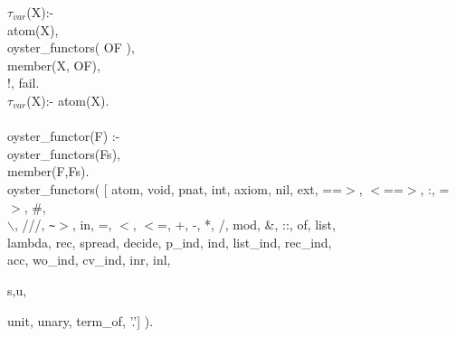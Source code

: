 \documentclass[11pt]{report}
\newcommand{\inv}[1]{\index{#1}}
\begin{document}
 \inv{$\tau_{var}$}
\begin{sf}\begin{tabbing}
$\tau_{var}$(X):-\\[-0.15ex]
\hspace{2em}atom(X),\\[-0.15ex]
\hspace{2em}oyster\_\hspace{0.1em}functors( OF ),\\[-0.15ex]
\hspace{2em}member(X, OF),\\[-0.15ex]
\hspace{2em}!, fail.\\[-0.15ex]
$\tau_{var}$(X):- atom(X).\\[-0.7ex]
\\[-0.15ex]
oyster\_\hspace{0.1em}functor(F) :-\\[-0.15ex]
\hspace{2em}oyster\_\hspace{0.1em}functors(Fs),\\[-0.15ex]
\hspace{2em}member(F,Fs).\\[-0.15ex]
oyster\_\hspace{0.1em}functors( [ atom, void, pnat, int, axiom, nil, ext, ==$>$, $<$==$>$, :, =$>$, \#, \\[-0.15ex]
\hspace{6em}$\backslash$, ///, {\verb`~`}$>$, in, =, $<$, $<$=, +, -, *, /, mod, \&, ::, of, list,\\[-0.15ex]
\hspace{6em}lambda, rec, spread, decide, p\_\hspace{0.1em}ind, ind, list\_\hspace{0.1em}ind, rec\_\hspace{0.1em}ind,\\[-0.15ex]
\hspace{6em}acc, wo\_\hspace{0.1em}ind, cv\_\hspace{0.1em}ind, inr, inl,
\end{tabbing}\end{sf}

            s,u, %
\begin{sf}\begin{tabbing}
\hspace{6em}unit, unary, term\_\hspace{0.1em}of, '.'] ).\\[-0.7ex]

\end{tabbing}\end{sf}
\end{document}
